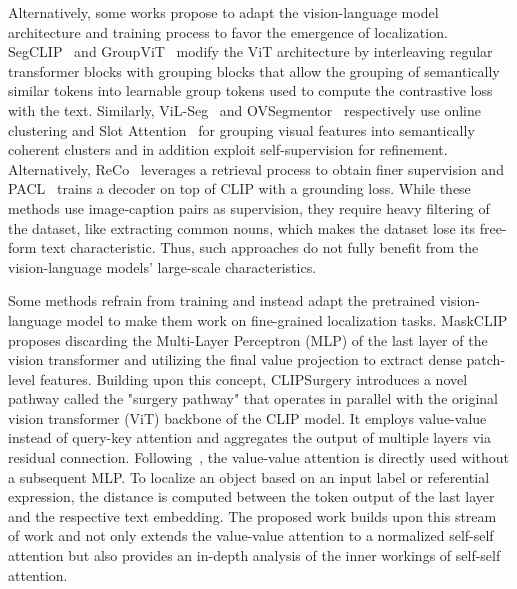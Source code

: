 \documentclass[10pt,twocolumn,letterpaper]{article}
\begin{document}
Alternatively, some works propose to adapt the vision-language model architecture and training process to favor the emergence of localization. SegCLIP~\citep{luo2023segclip} and GroupViT~\citep{xu2022groupvit} modify the ViT architecture by interleaving regular transformer blocks with grouping blocks that allow the grouping of semantically similar tokens into learnable group tokens used to compute the contrastive loss with the text. Similarly, ViL-Seg~\citep{liu2022open} and OVSegmentor~\citep{xu2023learning} respectively use online clustering and Slot Attention~\citep{locatello2020object} for grouping visual features into semantically coherent clusters and in addition exploit self-supervision for refinement. Alternatively, ReCo~\citep{liu2021bootstrapping} leverages a retrieval process to obtain finer supervision and PACL~\citep{mukhoti2023open} trains a decoder on top of CLIP with a grounding loss. 
While these methods use image-caption pairs as supervision, they require heavy filtering of the dataset, like extracting common nouns, which makes the dataset lose its free-form text characteristic. Thus, such approaches do not fully benefit from the vision-language models' large-scale characteristics.  

Some methods refrain from training and instead adapt the pretrained vision-language model to make them work on fine-grained localization tasks.
MaskCLIP \citep{zhou2022extract} proposes discarding the Multi-Layer Perceptron (MLP) of the last layer of the vision transformer and utilizing the final value projection to extract dense patch-level features. Building upon this concept, CLIPSurgery \citep{li2023clipsurgery} introduces a novel pathway called the "surgery pathway" that operates in parallel with the original vision transformer (ViT) backbone of the CLIP model. It employs value-value instead of query-key attention and aggregates the output of multiple layers via residual connection.
Following~\citep{zhou2022extract}, the value-value attention is directly used without a subsequent MLP. To localize an object based on an input label or referential expression, the distance is computed between the token output of the last layer and the respective text embedding. The proposed work builds upon this stream of work and not only extends the value-value attention to a normalized self-self attention but also provides an in-depth analysis of the inner workings of self-self attention.

 
\end{document}
